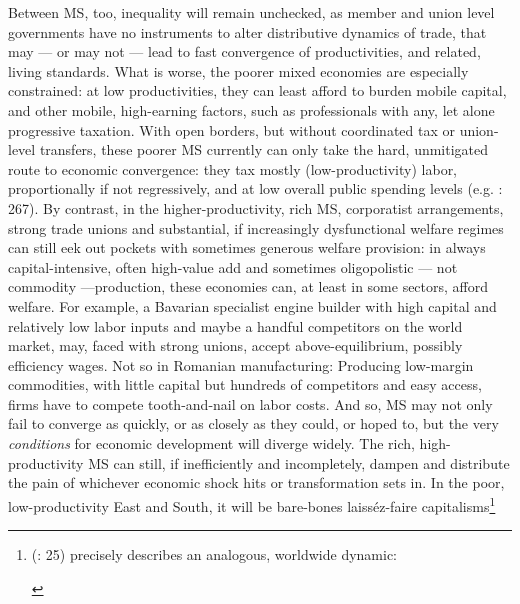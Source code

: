\documentclass[11pt,a4paper,oneside,openright]{article}
\begin{document}
Between \gls{MS}, too, inequality will remain unchecked, as member and union level governments have no instruments to alter distributive dynamics of trade, that may --- or may not --- lead to fast convergence of productivities, and related, living standards. What is worse, the poorer mixed economies are especially constrained: at low productivities, they can least afford to burden mobile capital, and other mobile, high-earning factors, such as professionals with any, let alone progressive taxation. With open borders, but without coordinated tax or union-level transfers, these poorer \gls{MS} currently can only take the hard, unmitigated route to economic convergence: they tax mostly (low-productivity) labor, proportionally if not regressively, and at low overall public spending levels (e.g. \cite{DaudUngl2008}: 267). By contrast, in the higher-productivity, rich \gls{MS}, corporatist arrangements, strong trade unions and substantial, if increasingly dysfunctional welfare regimes can still eek out pockets with sometimes generous welfare provision: in always capital-intensive, often high-value add and sometimes oligopolistic --- not commodity ---production, these economies can, at least in some sectors, afford welfare. For example, a Bavarian specialist engine builder with high capital and relatively low labor inputs and maybe a handful competitors on the world market,  may, faced with strong unions, accept above-equilibrium, possibly efficiency wages. Not so in Romanian manufacturing: Producing low-margin commodities, with little capital but hundreds of competitors and easy access, firms have to compete tooth-and-nail on labor costs. And so, \gls{MS} may not only fail to converge as quickly, or as closely as they could, or hoped to, but the very \emph{conditions} for economic development will diverge widely. The rich, high-productivity \gls{MS} can still, if inefficiently and incompletely, dampen and distribute the pain of whichever economic shock hits or transformation sets in. In the poor, low-productivity East and South, it will be bare-bones laiss\'{e}z-faire capitalisms\footnote{
	\citeauthor{Galbraith2002a} (\citeyear{Galbraith2002a}: 25) precisely describes an analogous, worldwide dynamic:
	\begin{quote}

\end{quote}}
\end{document}
